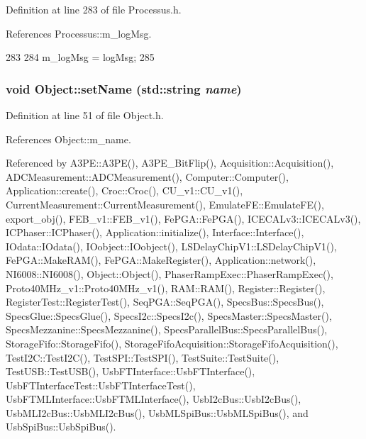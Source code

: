Definition at line 283 of file Processus.h.

References Processus::m\_\-logMsg.


\begin{DoxyCode}
283                                     {
284     m_logMsg = logMsg;
285   }
\end{DoxyCode}
\hypertarget{classObject_ae30fea75683c2d149b6b6d17c09ecd0c}{
\subsubsection[{setName}]{\setlength{\rightskip}{0pt plus 5cm}void Object::setName (std::string {\em name})}}
\label{classObject_ae30fea75683c2d149b6b6d17c09ecd0c}


Definition at line 51 of file Object.h.

References Object::m\_\-name.

Referenced by A3PE::A3PE(), A3PE\_\-BitFlip(), Acquisition::Acquisition(), ADCMeasurement::ADCMeasurement(), Computer::Computer(), Application::create(), Croc::Croc(), CU\_\-v1::CU\_\-v1(), CurrentMeasurement::CurrentMeasurement(), EmulateFE::EmulateFE(), export\_\-obj(), FEB\_\-v1::FEB\_\-v1(), FePGA::FePGA(), ICECALv3::ICECALv3(), ICPhaser::ICPhaser(), Application::initialize(), Interface::Interface(), IOdata::IOdata(), IOobject::IOobject(), LSDelayChipV1::LSDelayChipV1(), FePGA::MakeRAM(), FePGA::MakeRegister(), Application::network(), NI6008::NI6008(), Object::Object(), PhaserRampExec::PhaserRampExec(), Proto40MHz\_\-v1::Proto40MHz\_\-v1(), RAM::RAM(), Register::Register(), RegisterTest::RegisterTest(), SeqPGA::SeqPGA(), SpecsBus::SpecsBus(), SpecsGlue::SpecsGlue(), SpecsI2c::SpecsI2c(), SpecsMaster::SpecsMaster(), SpecsMezzanine::SpecsMezzanine(), SpecsParallelBus::SpecsParallelBus(), StorageFifo::StorageFifo(), StorageFifoAcquisition::StorageFifoAcquisition(), TestI2C::TestI2C(), TestSPI::TestSPI(), TestSuite::TestSuite(), TestUSB::TestUSB(), UsbFTInterface::UsbFTInterface(), UsbFTInterfaceTest::UsbFTInterfaceTest(), UsbFTMLInterface::UsbFTMLInterface(), UsbI2cBus::UsbI2cBus(), UsbMLI2cBus::UsbMLI2cBus(), UsbMLSpiBus::UsbMLSpiBus(), and UsbSpiBus::UsbSpiBus().


